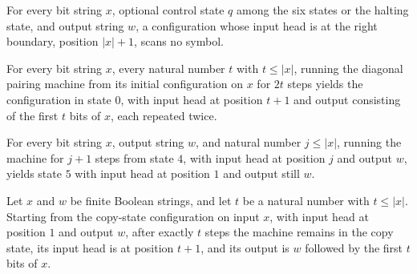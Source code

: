 \begin{lemma}
\label{Turing.pairDiag_right}
\leanok
{}
For every bit string $x$, optional control state $q$ among the six states or the halting
state, and output string $w$, a configuration whose input head is at the right boundary,
position $|x|+1$, scans no symbol.
\end{lemma}

\begin{lemma}
\label{Turing.pairDiag_double}
\leanok
{}
For every bit string $x$, every natural number $t$ with $t \le |x|$, running the
diagonal pairing machine from its initial configuration on $x$ for $2t$ steps yields the
configuration in state $0$, with input head at position $t+1$ and output consisting of
the first $t$ bits of $x$, each repeated twice.
\end{lemma}

\begin{lemma}
\label{Turing.pairDiag_rewind}
\leanok
{}
For every bit string $x$, output string $w$, and natural number $j\le |x|$, running the
machine for $j+1$ steps from state $4$, with input head at position $j$ and output $w$,
yields state $5$ with input head at position $1$ and output still $w$.
\end{lemma}

\begin{lemma}
\label{Turing.pairDiag_copy}
\leanok
{}
Let $x$ and $w$ be finite Boolean strings, and let $t$ be a natural number with $t\le
|x|$. Starting from the copy-state configuration on input $x$, with input head at
position $1$ and output $w$, after exactly $t$ steps the machine remains in the copy
state, its input head is at position $t+1$, and its output is $w$ followed by the first
$t$ bits of $x$.
\end{lemma}

